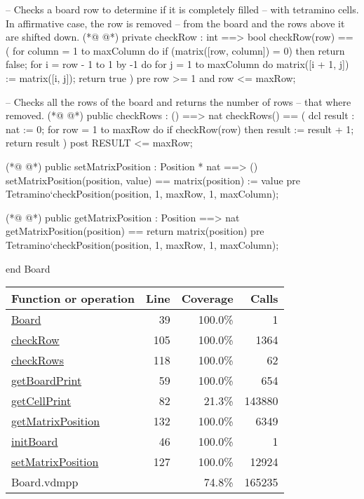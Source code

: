 \begin{vdmpp}[breaklines=true]
  -- Checks a board row to determine if it is completely filled
  -- with tetramino cells. In affirmative case, the row is removed
  -- from the board and the rows above it are shifted down.
(*@
\label{checkRow:105}
@*)
  private checkRow : int ==> bool
  checkRow(row) == (
   for column = 1 to maxColumn do
    if (matrix([row, column]) = 0) then return false;
   for i = row - 1 to 1 by -1 do
    for j = 1 to maxColumn do
     matrix([i + 1, j]) := matrix([i, j]);
   return true
  )
  pre row >= 1 and row <= maxRow;
  
  -- Checks all the rows of the board and returns the number of rows
  -- that where removed.
(*@
\label{checkRows:118}
@*)
  public checkRows : () ==> nat
  checkRows() == (
   dcl result : nat := 0;
   for row = 1 to maxRow do
    if checkRow(row) then result := result + 1;
   return result
  )
  post RESULT <= maxRow;
  
(*@
\label{setMatrixPosition:127}
@*)
  public setMatrixPosition : Position * nat ==> ()
  setMatrixPosition(position, value) ==
   matrix(position) := value
  pre Tetramino`checkPosition(position, 1, maxRow, 1, maxColumn);
  
(*@
\label{getMatrixPosition:132}
@*)
  public getMatrixPosition : Position ==> nat
  getMatrixPosition(position) ==
   return matrix(position)  
  pre Tetramino`checkPosition(position, 1, maxRow, 1, maxColumn);
 
end Board
\end{vdmpp}
\bigskip
\begin{longtable}{|l|r|r|r|}
\hline
Function or operation & Line & Coverage & Calls \\
\hline
\hline
\hyperref[Board:39]{Board} & 39&100.0\% & 1 \\
\hline
\hyperref[checkRow:105]{checkRow} & 105&100.0\% & 1364 \\
\hline
\hyperref[checkRows:118]{checkRows} & 118&100.0\% & 62 \\
\hline
\hyperref[getBoardPrint:59]{getBoardPrint} & 59&100.0\% & 654 \\
\hline
\hyperref[getCellPrint:82]{getCellPrint} & 82&21.3\% & 143880 \\
\hline
\hyperref[getMatrixPosition:132]{getMatrixPosition} & 132&100.0\% & 6349 \\
\hline
\hyperref[initBoard:46]{initBoard} & 46&100.0\% & 1 \\
\hline
\hyperref[setMatrixPosition:127]{setMatrixPosition} & 127&100.0\% & 12924 \\
\hline
\hline
Board.vdmpp & & 74.8\% & 165235 \\
\hline
\end{longtable}

